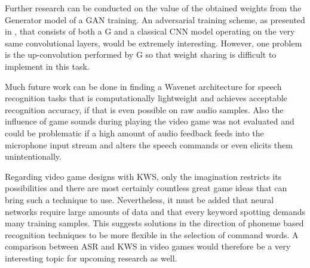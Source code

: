 Further research can be conducted on the value of the obtained weights from the Generator model of a GAN training. 
An adversarial training scheme, as presented in \cite{Oezdenizci2020}, that consists of both a G and a classical CNN model operating on the very same convolutional layers, would be extremely interesting. 
However, one problem is the up-convolution performed by G so that weight sharing is difficult to implement in this task.

Much future work can be done in finding a Wavenet architecture for speech recognition tasks that is computationally lightweight and achieves acceptable recognition accuracy, if that is even possible on raw audio samples.
Also the influence of game sounds during playing the video game was not evaluated and could be problematic if a high amount of audio feedback feeds into the microphone input stream and alters the speech commands or even elicits them unintentionally.

Regarding video game designs with KWS, only the imagination restricts its possibilities and there are most certainly countless great game ideas that can bring such a technique to use.
Nevertheless, it must be added that neural networks require large amounts of data and that every keyword spotting demands many training samples.
This suggests solutions in the direction of phoneme based recognition techniques to be more flexible in the selection of command words.
A comparison between ASR and KWS in video games would therefore be a very interesting topic for upcoming research as well.